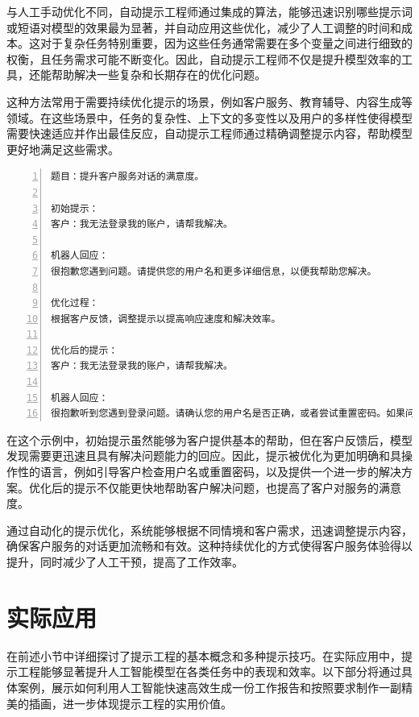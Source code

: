 与人工手动优化不同，自动提示工程师通过集成的算法，能够迅速识别哪些提示词或短语对模型的效果最为显著，并自动应用这些优化，减少了人工调整的时间和成本。这对于复杂任务特别重要，因为这些任务通常需要在多个变量之间进行细致的权衡，且任务需求可能不断变化。因此，自动提示工程师不仅是提升模型效率的工具，还能帮助解决一些复杂和长期存在的优化问题。

这种方法常用于需要持续优化提示的场景，例如客户服务、教育辅导、内容生成等领域。在这些场景中，任务的复杂性、上下文的多变性以及用户的多样性使得模型需要快速适应并作出最佳反应，自动提示工程师通过精确调整提示内容，帮助模型更好地满足这些需求。

\begin{lstlisting}[language={python},label={},caption={}, basicstyle=\footnotesize\ttfamily, breaklines=true, numbers=left, frame=single]
题目：提升客户服务对话的满意度。

初始提示：
客户：我无法登录我的账户，请帮我解决。

机器人回应：
很抱歉您遇到问题。请提供您的用户名和更多详细信息，以便我帮助您解决。

优化过程：
根据客户反馈，调整提示以提高响应速度和解决效率。

优化后的提示：
客户：我无法登录我的账户，请帮我解决。

机器人回应：
很抱歉听到您遇到登录问题。请确认您的用户名是否正确，或者尝试重置密码。如果问题仍然存在，请提供您的注册邮箱，我将进一步协助您。
\end{lstlisting}

在这个示例中，初始提示虽然能够为客户提供基本的帮助，但在客户反馈后，模型发现需要更迅速且具有解决问题能力的回应。因此，提示被优化为更加明确和具操作性的语言，例如引导客户检查用户名或重置密码，以及提供一个进一步的解决方案。优化后的提示不仅能更快地帮助客户解决问题，也提高了客户对服务的满意度。

通过自动化的提示优化，系统能够根据不同情境和客户需求，迅速调整提示内容，确保客户服务的对话更加流畅和有效。这种持续优化的方式使得客户服务体验得以提升，同时减少了人工干预，提高了工作效率。


\section{实际应用}

在前述小节中详细探讨了提示工程的基本概念和多种提示技巧。在实际应用中，提示工程能够显著提升人工智能模型在各类任务中的表现和效率。以下部分将通过具体案例，展示如何利用人工智能快速高效生成一份工作报告和按照要求制作一副精美的插画，进一步体现提示工程的实用价值。

